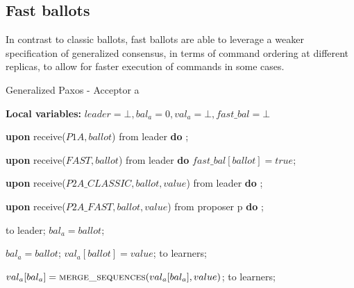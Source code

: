 \subsection{Fast ballots} 

In contrast to classic ballots, fast ballots are able to leverage a weaker specification of generalized consensus, in terms of command ordering at different replicas, to allow for faster execution of commands in some cases.

\begin{algorithm} 
	\caption{Generalized Paxos - Acceptor a}
	\label{CFT-Acc}
	\textbf{Local variables:} $leader = \bot, bal_a = 0,val_a = \bot,fast\_bal = \bot$
	\begin{algorithmic}[1]
		\State \textbf{upon} receive($P1A, ballot$) from leader \textbf{do}
		\State \hspace{\algorithmicindent} ;
		
		\State
		\State \textbf{upon} receive($FAST,ballot$) from leader \textbf{do}
		\State \hspace{\algorithmicindent} $fast\_bal[ballot] = true$;
		
		\State
		\State \textbf{upon} receive($P2A\_CLASSIC, ballot, value$) from leader \textbf{do}
		\State \hspace{\algorithmicindent} ; 
		
		\State		
		\State \textbf{upon} receive($P2A\_FAST,ballot,value$) from proposer p \textbf{do}
		\State \hspace{\algorithmicindent} ;
		
		\State
		\State {} to leader;
		\State $bal_a = ballot$;	
		\EndIf
		\EndFunction
		
		\State
		\State $bal_a = ballot$;
		\State $val_a[ballot] = value$;
		\State {} to learners;
		
		\EndIf
		\EndFunction
		
		\State
		\State $val_a[bal_a] =  \Call{merge\_sequences}{val_a[bal_a], value}$;
		\State {} to learners;
		\EndIf
		\EndFunction
	\end{algorithmic}
\end{algorithm}
